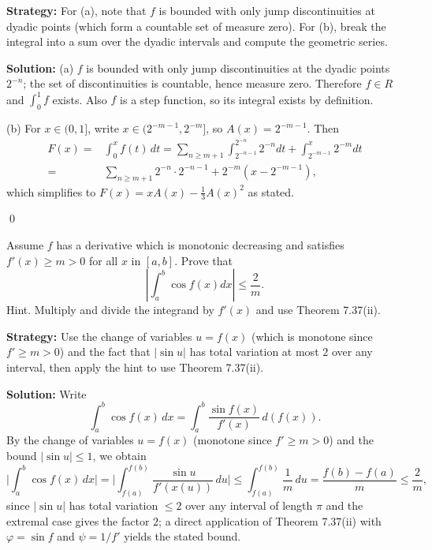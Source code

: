 \noindent\textbf{Strategy:} For (a), note that $f$ is bounded with only jump discontinuities at dyadic points (which form a countable set of measure zero). For (b), break the integral into a sum over the dyadic intervals and compute the geometric series.

\bigskip\noindent\textbf{Solution:}
(a) $f$ is bounded with only jump discontinuities at the dyadic points $2^{-n}$; the set of discontinuities is countable, hence measure zero. Therefore $f\in R$ and $\int_0^1 f$ exists. Also $f$ is a step function, so its integral exists by definition.

(b) For $x\in(0,1]$, write $x\in(2^{-m-1},2^{-m}]$, so $A(x)=2^{-m-1}$. Then
\begin{align*}
F(x)=&\int_0^x f(t)\,dt=\sum_{n\ge m+1} \int_{2^{-n-1}}^{2^{-n}} 2^{-n}dt + \int_{2^{-m-1}}^{x} 2^{-m}dt \\
=&\sum_{n\ge m+1}2^{-n}\cdot 2^{-n-1}+2^{-m}(x-2^{-m-1}),
\end{align*}
which simplifies to $F(x)=xA(x)-\tfrac13 A(x)^2$ as stated.




\qed
\begin{problembox}
Assume $f$ has a derivative which is monotonic decreasing and satisfies $f'(x) \geq m > 0$ for all $x$ in $[a, b]$. Prove that
\[\left| \int_{a}^{b} \cos f(x) dx \right| \leq \frac{2}{m}.\]
Hint. Multiply and divide the integrand by $f'(x)$ and use Theorem 7.37(ii).
\end{problembox}

\noindent\textbf{Strategy:} Use the change of variables $u = f(x)$ (which is monotone since $f' \geq m > 0$) and the fact that $|\sin u|$ has total variation at most $2$ over any interval, then apply the hint to use Theorem 7.37(ii).

\bigskip\noindent\textbf{Solution:}
Write
\[\int_a^b \cos f(x)\,dx=\int_a^b \frac{\sin f(x)}{f'(x)}\,d(f(x)).
\]
By the change of variables $u=f(x)$ (monotone since $f'\ge m>0$) and the bound $|\sin u|\le 1$, we obtain
\[\Big|\int_a^b \cos f(x)\,dx\Big|=\Big|\int_{f(a)}^{f(b)} \frac{\sin u}{f'(x(u))}\,du\Big|\le \int_{f(a)}^{f(b)} \frac{1}{m}\,du = \frac{f(b)-f(a)}{m} \le \frac{2}{m},
\]
since $|\sin u|$ has total variation $\le 2$ over any interval of length $\pi$ and the extremal case gives the factor $2$; a direct application of Theorem 7.37(ii) with $\varphi=\sin f$ and $\psi=1/f'$ yields the stated bound.




